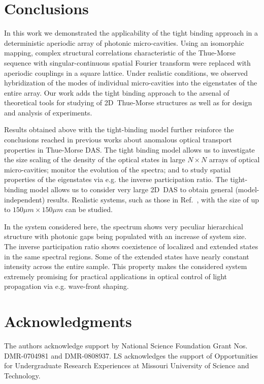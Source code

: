 \section{Conclusions}
\label{sec:conclusions_TB}
In this work we demonstrated the applicability of the tight binding approach in a deterministic aperiodic array of photonic micro-cavities. Using an isomorphic mapping, complex structural correlations characteristic of the Thue-Morse sequence with singular-continuous spatial Fourier transform were replaced with aperiodic couplings in a square lattice. Under realistic conditions, we observed hybridization of the modes of individual micro-cavities into the eigenstates of the entire array. Our work adds the tight binding approach to the arsenal of theoretical tools for studying of 2D~Thue-Morse structures as well as for design and analysis of experiments.

Results obtained above with the tight-binding model further reinforce the conclusions reached in previous works about anomalous optical transport properties in Thue-Morse DAS. The tight binding model allows us to investigate the size scaling of the density of the optical states in large $N\times N$ arrays of optical micro-cavities; monitor the evolution of the spectra; and to study spatial properties of the eigenstates via e.g. the inverse participation ratio. The tight-binding model allows us to consider very large 2D~DAS to obtain general (model-independent) results. Realistic systems, such as those in Ref.~, with the size of up to $150\mu m\times 150\mu m$ can be studied. 

In the system considered here, the spectrum shows very peculiar hierarchical structure with photonic gaps being populated with an increase of system size. The inverse participation ratio shows coexistence of localized and extended states in the same spectral regions. Some of the extended states have nearly constant intensity across the entire sample. This property makes the considered system extremely promising for practical applications in optical control of light propagation via e.g. wave-front shaping.
 
\section{Acknowledgments} 
The authors acknowledge support by National Science Foundation Grant Nos. DMR-0704981 and DMR-0808937. LS acknowledges the support of Opportunities for Undergraduate Research Experiences at Missouri University of Science and Technology.


